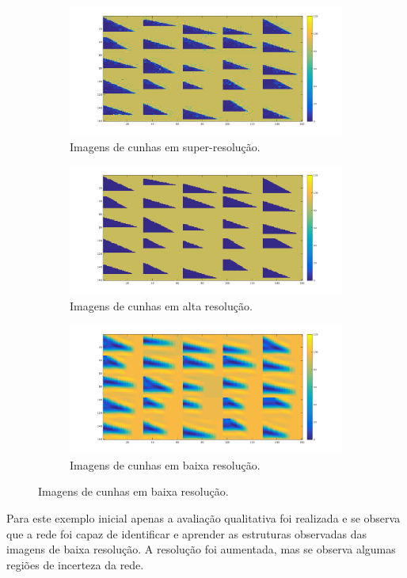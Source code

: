 \begin{figure}[ht]
\centering
\begin{subfigure}{.8\textwidth}
 \centering
  \includegraphics[width=.7\linewidth]{fig/result_cunha_pixel}
  \caption{Imagens de cunhas em super-resolução.}
  \label{fig:result_cunha_pixel}
\end{subfigure}

\begin{subfigure}{.8\textwidth}
 \centering
  \includegraphics[width=.7\linewidth]{fig/cunha_pixel_hr}
  \caption{Imagens de cunhas em alta resolução.}
  \label{fig:cunha_pixel_hr}
\end{subfigure}

\begin{subfigure}{.8\textwidth}
  \centering
  \includegraphics[width=.7\linewidth]{fig/cunha_pixel_lr}
  \caption{Imagens de cunhas em baixa resolução.}
  \label{fig:cunha_pixel_lr}
\end{subfigure}
\end{figure}

Para este exemplo inicial apenas a avaliação qualitativa foi realizada e se observa que a rede foi capaz de 
identificar e aprender as estruturas observadas das imagens de baixa resolução. A resolução foi
aumentada, mas se observa algumas regiões de incerteza da rede.

